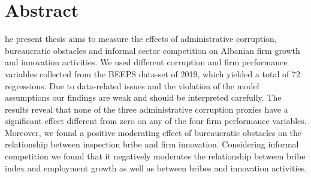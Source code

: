 %
%


\chapter*{Abstract}
he present thesis aims to measure the effects of administrative corruption, bureaucratic obstacles and informal sector competition on Albanian firm growth and innovation activities. We used different corruption and firm performance variables collected from the BEEPS data-set of 2019, which yielded a total of 72 regressions. Due to data-related issues and the violation of the model assumptions our findings are weak and should be interpreted carefully. The results reveal that none of the three administrative corruption proxies have a significant effect different from zero on any of the four firm performance variables. Moreover, we found a positive moderating effect of bureaucratic obstacles on the relationship between inspection bribe and firm innovation. Considering informal competition we found that it negatively moderates the relationship between bribe index and employment growth as well as between bribes and innovation activities. 

\clearpage